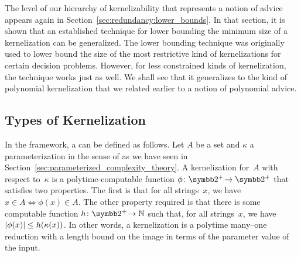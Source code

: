 The level of our hierarchy of kernelizability that represents a notion of advice appears again in Section~\ref{sec:redundancy:lower_bounds}.
In that section, it is shown that an established technique for lower bounding the minimum size of a kernelization can be generalized.
The lower bounding technique was originally used to lower bound the size of the most restrictive kind of kernelizations for certain decision problems.
However, for less constrained kinds of kernelization, the technique works just as well.
We shall see that it generalizes to the kind of polynomial kernelization that we related earlier to a notion of polynomial advice.

\subsection{Types of Kernelization}
\label{sec:redundancy:types}%
In the \citeauthor{flum2006parameterized} framework, a  can be defined as follows.
Let $A$ be a set and $\kappa$ a parameterization in the sense of \citeauthor{flum2006parameterized} as we have seen in Section~\ref{sec:parameterized_complexity_theory}.
A kernelization for~$A$ with respect to~$\kappa$ is a polytime-computable function $\phi\colon \binary^+\! \to \binary^+$ that satisfies two properties.
The first is that for all strings~$x$, we have $x \in A \iff \phi(x) \in A$.
The other property required is that there is some computable function $h\colon \binary^+\! \to \bbN$ such that, for all strings~$x$, we have ${\lvert\phi(x)\rvert} \le h(\kappa(x))$.
In other words, a kernelization is a polytime many--one reduction with a length bound on the image in terms of the parameter value of the input.

